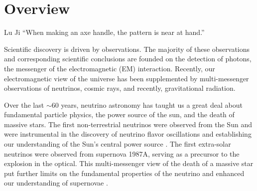 \chapter[Overview]{Overview} \label{ch:intro}
%
%
%
%
%
%
%
%
\vspace{-16pt} \begin{chapquote}{Lu Ji} \singlespacing ``When making an axe handle, the pattern is near at hand.'' 
 \end{chapquote} \vspace{-8pt}
\noindent\makebox[\linewidth]{\rule{0.5\textwidth}{0.5pt}} \vspace{1pt}

Scientific discovery is driven by observations. The majority of these
observations and corresponding scientific conclusions are founded on the
detection of photons, the messenger of the electromagnetic (EM) interaction.
Recently, our electromagnetic view of the universe has been supplemented by
multi-messenger observations of neutrinos, cosmic rays, and recently,
gravitational radiation.


Over the last $\sim 60$ years, neutrino astronomy has taught us a great deal
about fundamental particle physics, the power source of the sun, and the death
of massive stars. The first non-terrestrial neutrinos were observed from the
Sun and were instrumental in the discovery of neutrino flavor oscillations and
establishing our understanding of the Sun's central power source
\citep{Haxton:SolarNeutrinos:2013}. The first extra-solar neutrinos were
observed from supernova 1987A, serving as a precursor to the explosion in the
optical. This multi-messenger view of the death of a massive star put further
limits on the fundamental properties of the neutrino and enhanced our
understanding of supernovae \citep{Hirata:1987, Bionta:1987}.




